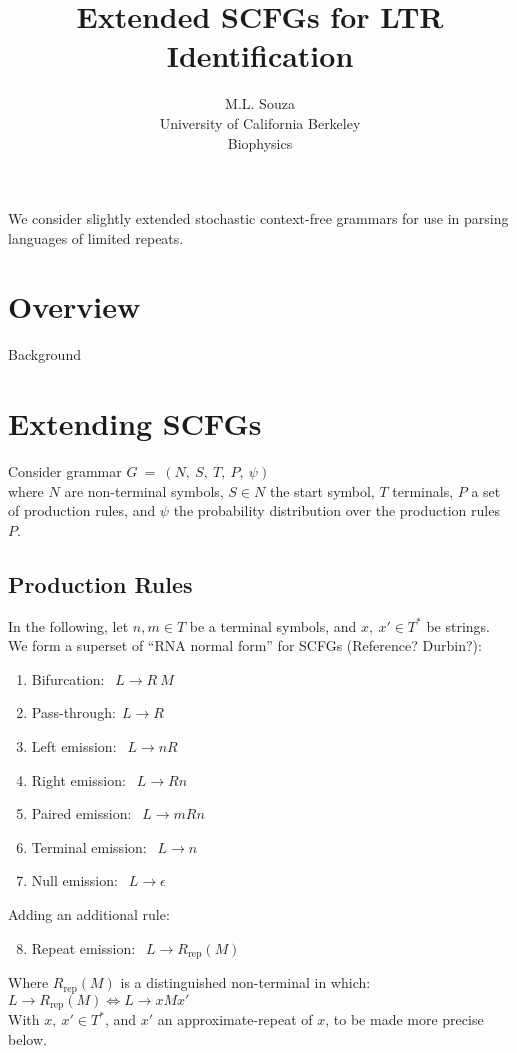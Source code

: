 \documentclass[11pt]{article}
\begin{document}
\title{Extended SCFGs for LTR Identification}

\author{M.L. Souza\\
University of California Berkeley\\
Biophysics}

\renewcommand{\today}{August 22, 2011}
\maketitle
We consider slightly extended stochastic context-free grammars
for use in parsing languages of limited repeats.

\section {Overview}
Background
\section {Extending SCFGs}
Consider grammar $G \ = \ (N, \ S, \ T, \ P, \ \psi)$ \\
where $N$ are non-terminal symbols, $S \in N$ the start symbol, $T$ terminals, $P$ a set of production rules,
and $\psi$ the probability distribution over the production rules $P$.
\subsection {Production Rules}
In the following, let $n,m \in T$ be a terminal symbols, and $x,\ x' \in T^*$ be strings. \\
We form a superset of ``RNA normal form'' for SCFGs (Reference? Durbin?):
\begin{enumerate}
\item Bifurcation: $\ \ L \rightarrow R \ M$
\item Pass-through:$\ \ L \rightarrow R$
\item Left emission: $\ \ L \rightarrow n R$
\item Right emission: $\ \ L \rightarrow R n$
\item Paired emission: $\ \ L \rightarrow m R n$ 
\item Terminal emission: $\ \ L \rightarrow n$
\item Null emission: $\ \ L \rightarrow \epsilon$ 
\end{enumerate}
Adding an additional rule:
\begin{enumerate}
\setcounter{enumi}{7}
\item Repeat emission: $\ \ L \rightarrow R_\text{rep}(M)$
\end{enumerate}
Where $R_\text{rep}(M)$ is a distinguished non-terminal in which: $ L \rightarrow R_\text{rep}(M) \Leftrightarrow L \rightarrow x M x'$ \\
With $x, \ x' \in T^*$, and $x'$ an approximate-repeat of $x$, to be made more precise below.
\end{document}
